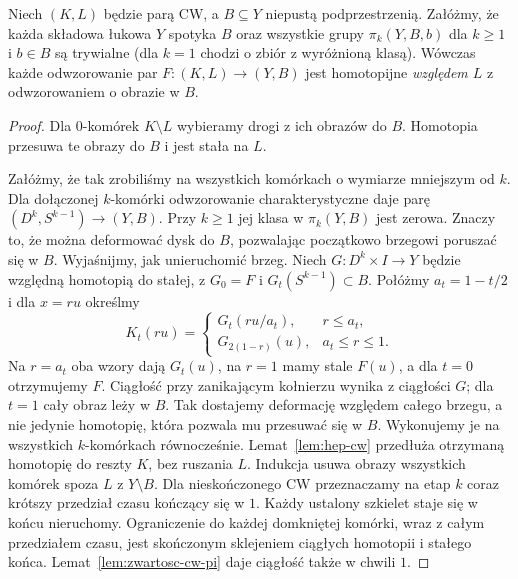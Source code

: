\begin{lemat}
\label{lem:kompresja-cw}
Niech $(K,L)$ będzie parą CW,
a $B\subseteq Y$ niepustą
podprzestrzenią. Załóżmy, że
każda składowa łukowa $Y$ spotyka
$B$ oraz wszystkie grupy
$\pi_k(Y,B,b)$ dla
$k\geq1$ i $b\in B$
są trywialne (dla $k=1$ chodzi o zbiór z wyróżnioną klasą). Wówczas
każde odwzorowanie par
$F:(K,L)\to(Y,B)$
jest homotopijne
\emph{względem $L$}
z odwzorowaniem o obrazie w $B$.
\end{lemat}
\begin{proof}
Dla $0$-komórek $K\setminus L$
wybieramy drogi z ich obrazów
do $B$. Homotopia przesuwa
te obrazy do $B$ i jest
stała na $L$.

Załóżmy, że tak zrobiliśmy
na wszystkich komórkach
o wymiarze mniejszym od $k$.
Dla dołączonej $k$-komórki
odwzorowanie charakterystyczne
daje parę
$(D^k,S^{k-1})\to(Y,B)$.
Przy $k\geq1$ jej klasa
w $\pi_k(Y,B)$ jest zerowa.
Znaczy to, że można
deformować dysk do $B$,
pozwalając początkowo
brzegowi poruszać się w $B$.
Wyjaśnijmy, jak unieruchomić brzeg. Niech
$G:D^k\times I\to Y$ będzie względną homotopią do stałej,
z $G_0=F$ i $G_t(S^{k-1})\subset B$.
Połóżmy $a_t=1-t/2$ i dla $x=ru$ określmy
\[
 K_t(ru)=
 \begin{cases}
 G_t(ru/a_t),&r\leq a_t,\\
 G_{2(1-r)}(u),&a_t\leq r\leq1.
 \end{cases}
\]
Na $r=a_t$ oba wzory dają $G_t(u)$, na $r=1$ mamy stale $F(u)$,
a dla $t=0$ otrzymujemy $F$. Ciągłość przy zanikającym kołnierzu
wynika z ciągłości $G$; dla $t=1$ cały obraz leży w $B$.
Tak dostajemy deformację względem całego brzegu, a nie jedynie
homotopię, która pozwala mu przesuwać się w $B$.
Wykonujemy je na
wszystkich $k$-komórkach
równocześnie.
Lemat~\ref{lem:hep-cw}
przedłuża otrzymaną
homotopię do reszty
$K$, bez ruszania $L$.
Indukcja usuwa obrazy
wszystkich komórek
spoza $L$ z $Y\setminus B$.
Dla nieskończonego CW
przeznaczamy na etap $k$
coraz krótszy przedział
czasu kończący się w $1$.
Każdy ustalony szkielet staje się w końcu nieruchomy.
Ograniczenie do każdej domkniętej komórki, wraz z całym przedziałem czasu,
jest skończonym sklejeniem ciągłych homotopii i stałego końca.
Lemat~\ref{lem:zwartosc-cw-pi} daje ciągłość także w chwili $1$.
\end{proof}


